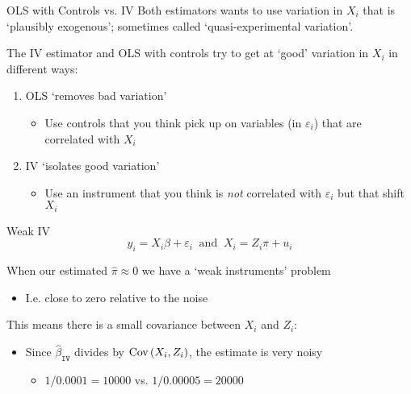 \documentclass[aspectratio=169,t,11pt,table]{beamer}
\begin{document}
\begin{frame}{OLS with Controls vs. IV}
  Both estimators wants to use variation in $X_i$ that is `plausibly exogenous'; sometimes called `quasi-experimental variation'. 
  
  \bigskip
  The IV estimator and OLS with controls try to get at `good' variation in $X_i$ in different ways:

  \bigskip
  \begin{enumerate}
    \item OLS `removes bad variation'
    \begin{itemize}
      \item Use controls that you think pick up on variables (in $\varepsilon_i$) that are correlated with $X_i$
      
    \end{itemize}
    
    \medskip
    \item IV `isolates good variation'
    \begin{itemize}
      \item Use an instrument that you think is \emph{not} correlated with $\varepsilon_i$ but that shift $X_i$ 
      
    \end{itemize}
  \end{enumerate}
\end{frame}



\begin{frame}{Weak IV}
  \vspace{-\bigskipamount}
  $$
    y_i = X_i \beta + \varepsilon_i \ \text{ and }\  X_i = Z_i \pi  + u_i
  $$
  
  \bigskip
  When our estimated $\hat{\pi} \approx 0$ we have a `weak instruments' problem
  \begin{itemize}
    \item I.e. close to zero relative to the noise
  \end{itemize}

  \pause
  \bigskip
  This means there is a small covariance between $X_i$ and $Z_i$:
  \begin{itemize}
    \item Since $\hat{\beta}_{\texttt{IV}}$ divides by $\cov{X_i, Z_i}$, the estimate is very noisy 
    \begin{itemize}
      \item $1/0.0001 = 10000$ vs. $1/0.00005 = 20000$
    \end{itemize}
  \end{itemize}
\end{frame}
\end{document}
